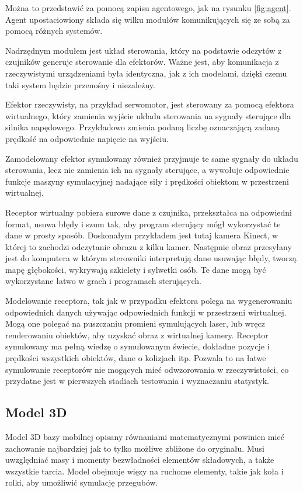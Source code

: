 	Można to przedstawić za pomocą zapisu agentowego, jak na rysunku \ref{fig:agent}.
	Agent upostaciowiony składa się wilku modułów komunikujących się ze sobą za pomocą różnych systemów.

	Nadrzędnym modułem jest układ sterowania, który na podstawie odczytów z czujników generuje sterowanie dla efektorów.
	Ważne jest, aby komunikacja z rzeczywistymi urządzeniami była identyczna, jak z ich modelami, dzięki czemu taki system będzie przenośny i niezależny.

	Efektor rzeczywisty, na przykład serwomotor, jest sterowany za pomocą efektora wirtualnego, który zamienia wyjście układu sterowania na sygnały sterujące dla silnika napędowego.
	Przykładowo zmienia podaną liczbę oznaczającą zadaną prędkość na odpowiednie napięcie na wyjściu.

	Zamodelowany efektor symulowany również przyjmuje te same sygnały do układu sterowania, lecz nie zamienia ich na sygnały sterujące, a wywołuje odpowiednie funkcje maszyny symulacyjnej nadające siły i prędkości obiektom w przestrzeni wirtualnej.

	Receptor wirtualny pobiera surowe dane z czujnika, przekształca na odpowiedni format, usuwa błędy i szum tak, aby program sterujący mógł wykorzystać te dane w prosty sposób. 
	Doskonałym przykładem jest tutaj kamera Kinect, w której to zachodzi odczytanie obrazu z kilku kamer.
	Następnie obraz przesyłany jest do komputera w którym sterowniki interpretują dane usuwając błędy, tworzą mapę głębokości, wykrywają szkielety i sylwetki osób.
	Te dane mogą być wykorzystane łatwo w grach i programach sterujących.

	Modelowanie receptora, tak jak w przypadku efektora polega na wygenerowaniu odpowiednich danych używając odpowiednich funkcji w przestrzeni wirtualnej.
	Mogą one polegać na puszczaniu promieni symulujących laser, lub wręcz renderowaniu obiektów, aby uzyskać obraz z wirtualnej kamery.
	Receptor symulowany ma pełną wiedzę o symulowanym świecie, dokładne pozycje i prędkości wszystkich obiektów, dane o kolizjach itp. 
	Pozwala to na łatwe symulowanie receptorów nie mogących mieć odwzorowania w rzeczywistości, co przydatne jest w pierwszych stadiach testowania i wyznaczaniu statystyk.

	\subsection{Model 3D}
	Model 3D bazy mobilnej opisany równaniami matematycznymi powinien mieć zachowanie najbardziej jak to tylko możliwe zbliżone do oryginału.
	Musi uwzględniać masy i momenty bezwładności elementów składowych, a także wszystkie tarcia.
	Model obejmuje więzy na ruchome elementy, takie jak koła i rolki, aby umożliwić symulację przegubów.

